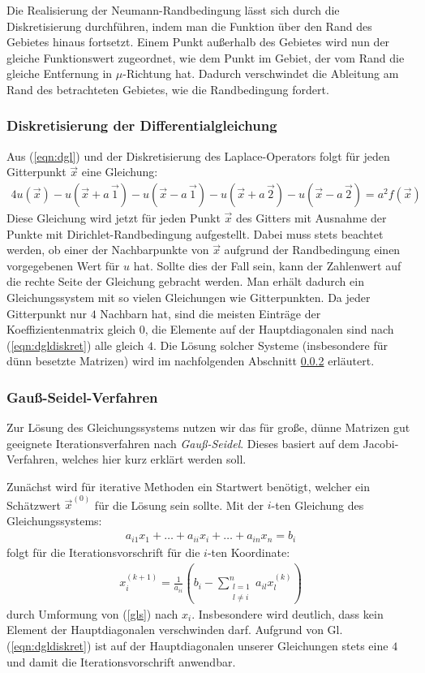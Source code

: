 \documentclass[10pt,a4paper]{article}
\begin{document}
Die Realisierung der Neumann-Randbedingung lässt sich durch die Diskretisierung durchführen, indem man die Funktion über den Rand des Gebietes hinaus fortsetzt. Einem Punkt außerhalb des Gebietes wird nun der gleiche Funktionswert zugeordnet, wie dem Punkt im 
Gebiet, der vom Rand die gleiche Entfernung in $\mu$-Richtung hat. Dadurch verschwindet die Ableitung am Rand des betrachteten Gebietes, wie die Randbedingung fordert.


\subsubsection{Diskretisierung der Differentialgleichung}
Aus (\ref{eqn:dgl}) und der Diskretisierung des Laplace-Operators folgt für jeden Gitterpunkt $\vec{x}$ eine Gleichung:
\begin{align}
4 u(\vec{x}) - u(\vec{x}+a\,\vec{1}) - u(\vec{x}-a\,\vec{1}) - u(\vec{x}+a\,\vec{2}) - u(\vec{x}-a\,\vec{2}) = a^2 f(\vec{x})
\label{eqn:dgldiskret}
\end{align}
Diese Gleichung wird jetzt für jeden Punkt $\vec{x}$ des Gitters mit Ausnahme der Punkte mit Dirichlet-Randbedingung aufgestellt. Dabei muss stets beachtet werden, ob einer der Nachbarpunkte von $\vec{x}$ aufgrund der Randbedingung einen vorgegebenen Wert für $u$ hat. Sollte dies der Fall sein, kann der Zahlenwert auf die rechte Seite der Gleichung gebracht werden.
Man erhält dadurch ein Gleichungssystem mit so vielen Gleichungen wie Gitterpunkten. Da jeder Gitterpunkt nur $4$ Nachbarn hat, sind die meisten Einträge der Koeffizientenmatrix gleich $0$, die Elemente auf der Hauptdiagonalen sind nach (\ref{eqn:dgldiskret}) alle gleich $4$. Die Lösung solcher Systeme (insbesondere für dünn besetzte Matrizen) wird im nachfolgenden Abschnitt \ref{sec:gauss-seidel} erläutert.

\subsubsection{Gauß-Seidel-Verfahren}
\label{sec:gauss-seidel}
Zur Lösung des Gleichungssystems nutzen wir das für große, dünne Matrizen gut geeignete Iterationsverfahren nach \emph{Gauß-Seidel}. Dieses basiert auf dem Jacobi-Verfahren, welches hier kurz erklärt werden soll.

Zunächst wird für iterative Methoden ein Startwert benötigt, welcher ein Schätzwert $\vec{x}^{(0)}$ für die Lösung sein sollte. Mit der $i$-ten Gleichung des Gleichungssystems:
\begin{align}
\label{gls}
a_{i1} x_{1} + \dots + a_{ii} x_{i} + \dots + a_{in} x_{n} = b_i
\end{align}
folgt für die Iterationsvorschrift für die $i$-ten Koordinate:
\begin{align}
\label{iterationsvorschrift}
x_i^{(k+1)} = \frac{1}{a_{ii}}\left( b_i - \sum^{n}_{\substack{l=1 \\ l \neq i}} a_{il} x_l^{(k)} \right) 
\end{align}
durch Umformung von (\ref{gls}) nach $x_i$. Insbesondere wird deutlich, dass kein Element der Hauptdiagonalen verschwinden darf. Aufgrund von Gl. (\ref{eqn:dgldiskret}) ist auf der Hauptdiagonalen unserer Gleichungen stets eine $\num{4}$ und damit die Iterationsvorschrift anwendbar.
\end{document}
